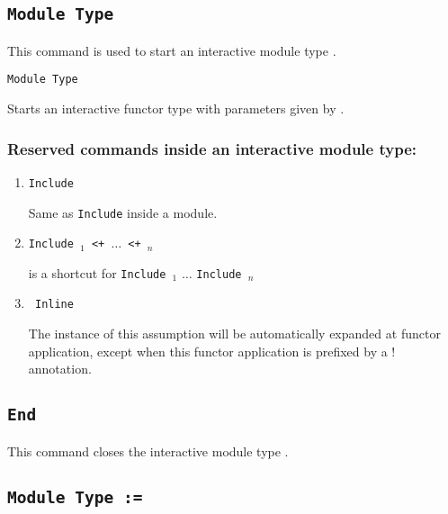 \subsection{\tt Module Type {\ident}
}

This command is used to start an interactive module type {\ident}.

\begin{Variants}

\item{\tt Module Type {\ident} {\modbindings}}

  Starts an interactive functor type with parameters given by {\modbindings}.

\end{Variants}
\subsubsection{Reserved commands inside an interactive module type:
}
\label{Inline}
\begin{enumerate}
\item {\tt Include {\module}}

 Same as {\tt Include} inside a module.

\item {\tt Include {\module$_1$} \verb.<+. $\ldots$ \verb.<+. {\module$_n$}}

is a shortcut for {\tt Include {\module$_1$}}  $\ldots$ {\tt Include {\module$_n$}}

\item {\tt {\assumptionkeyword} Inline {\assums} }

 The instance of this assumption will be automatically expanded at functor
 application, except when this functor application is prefixed by a $!$ annotation.
\end{enumerate}
\subsection{\tt End {\ident}
}

This command closes the interactive module type {\ident}.

\begin{ErrMsgs}
\item {}
\end{ErrMsgs}

\subsection{\tt Module Type {\ident} := {\modtype}}

